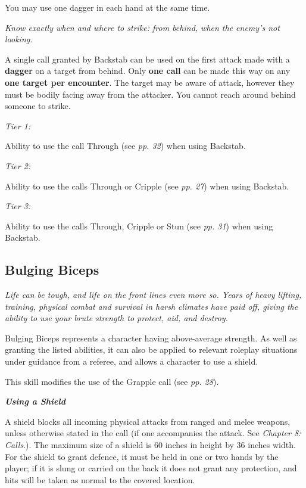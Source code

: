 \documentclass{scrbook}
\begin{document}
You may use one dagger in each hand at the same time.

\textit{Know exactly when and where to strike: from behind, when the enemy's not looking.}

A single call granted by Backstab can be used on the first attack made with a \textbf{dagger} on a target from behind. Only \textbf{one call} can be made this way on any \textbf{one target per encounter}. The target may be aware of attack, however they must be bodily facing away from the attacker. You cannot reach around behind someone to strike.

\textit{Tier 1:}

Ability to use the call Through (see \textit{pp. 32}) when using Backstab.

\textit{Tier 2:}

Ability to use the calls Through or Cripple (see \textit{pp. 27}) when using Backstab.

\textit{Tier 3:}

Ability to use the calls Through, Cripple or Stun (see \textit{pp. 31}) when using Backstab.

\subsection{Bulging Biceps}

\textit{Life can be tough, and life on the front lines even more so. Years of heavy lifting, training, physical combat and survival in harsh climates have paid off, giving the ability to use your brute strength to protect, aid, and destroy.}

Bulging Biceps represents a character having above-average strength. As well as granting the listed abilities, it can also be applied to relevant roleplay situations under guidance from a referee, and allows a character to use a shield.

This skill modifies the use of the Grapple call (see \textit{pp. 28}).

\textbf{\textit{Using a Shield}}

A shield blocks all incoming physical attacks from ranged and melee weapons, unless otherwise stated in the call (if one accompanies the attack. See \textit{Chapter 8: Calls}.). The maximum size of a shield is 60 inches in height by 36 inches width. For the shield to grant defence, it must be held in one or two hands by the player; if it is slung or carried on the back it does not grant any protection, and hits will be taken as normal to the covered location.
\end{document}
